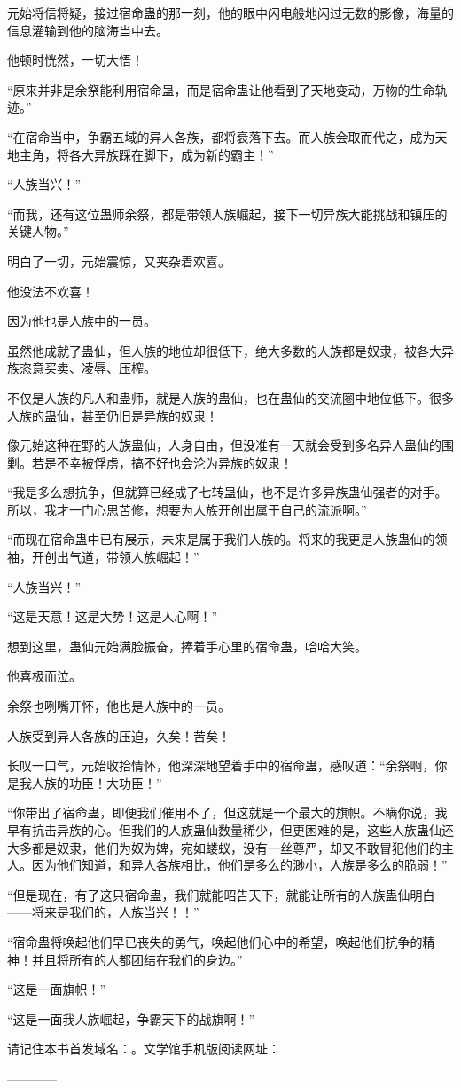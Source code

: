 \begin{this_body}
元始将信将疑，接过宿命蛊的那一刻，他的眼中闪电般地闪过无数的影像，海量的信息灌输到他的脑海当中去。

他顿时恍然，一切大悟！

“原来并非是余祭能利用宿命蛊，而是宿命蛊让他看到了天地变动，万物的生命轨迹。”

“在宿命当中，争霸五域的异人各族，都将衰落下去。而人族会取而代之，成为天地主角，将各大异族踩在脚下，成为新的霸主！”

“人族当兴！”

“而我，还有这位蛊师余祭，都是带领人族崛起，接下一切异族大能挑战和镇压的关键人物。”

明白了一切，元始震惊，又夹杂着欢喜。

他没法不欢喜！

因为他也是人族中的一员。

虽然他成就了蛊仙，但人族的地位却很低下，绝大多数的人族都是奴隶，被各大异族恣意买卖、凌辱、压榨。

不仅是人族的凡人和蛊师，就是人族的蛊仙，也在蛊仙的交流圈中地位低下。很多人族的蛊仙，甚至仍旧是异族的奴隶！

像元始这种在野的人族蛊仙，人身自由，但没准有一天就会受到多名异人蛊仙的围剿。若是不幸被俘虏，搞不好也会沦为异族的奴隶！

“我是多么想抗争，但就算已经成了七转蛊仙，也不是许多异族蛊仙强者的对手。所以，我才一门心思苦修，想要为人族开创出属于自己的流派啊。”

“而现在宿命蛊中已有展示，未来是属于我们人族的。将来的我更是人族蛊仙的领袖，开创出气道，带领人族崛起！”

“人族当兴！”

“这是天意！这是大势！这是人心啊！”

想到这里，蛊仙元始满脸振奋，捧着手心里的宿命蛊，哈哈大笑。

他喜极而泣。

余祭也咧嘴开怀，他也是人族中的一员。

人族受到异人各族的压迫，久矣！苦矣！

长叹一口气，元始收拾情怀，他深深地望着手中的宿命蛊，感叹道：“余祭啊，你是我人族的功臣！大功臣！”

“你带出了宿命蛊，即便我们催用不了，但这就是一个最大的旗帜。不瞒你说，我早有抗击异族的心。但我们的人族蛊仙数量稀少，但更困难的是，这些人族蛊仙还大多都是奴隶，他们为奴为婢，宛如蝼蚁，没有一丝尊严，却又不敢冒犯他们的主人。因为他们知道，和异人各族相比，他们是多么的渺小，人族是多么的脆弱！”

“但是现在，有了这只宿命蛊，我们就能昭告天下，就能让所有的人族蛊仙明白——将来是我们的，人族当兴！！”

“宿命蛊将唤起他们早已丧失的勇气，唤起他们心中的希望，唤起他们抗争的精神！并且将所有的人都团结在我们的身边。”

“这是一面旗帜！”

“这是一面我人族崛起，争霸天下的战旗啊！”

请记住本书首发域名：。文学馆手机版阅读网址：

------------

\end{this_body}


